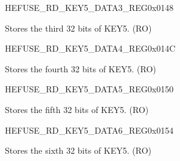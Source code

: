 \begin{register}{H}{EFUSE\_RD\_KEY5\_DATA3\_REG}{0x0148}\label{regdesc:EFUSERDKEY5DATA3REG}
%
\regnewline%
\begin{regdesc}\begin{reglist}
\label{fielddesc:EFUSEKEY5DATA3}\item [EFUSE\_KEY5\_DATA3] Stores the third 32 bits of KEY5. (RO)
\end{reglist}\end{regdesc}
\end{register}


\begin{register}{H}{EFUSE\_RD\_KEY5\_DATA4\_REG}{0x014C}\label{regdesc:EFUSERDKEY5DATA4REG}
%
\regnewline%
\begin{regdesc}\begin{reglist}
\label{fielddesc:EFUSEKEY5DATA4}\item [EFUSE\_KEY5\_DATA4] Stores the fourth 32 bits of KEY5. (RO)
\end{reglist}\end{regdesc}
\end{register}


\begin{register}{H}{EFUSE\_RD\_KEY5\_DATA5\_REG}{0x0150}\label{regdesc:EFUSERDKEY5DATA5REG}
%
\regnewline%
\begin{regdesc}\begin{reglist}
\label{fielddesc:EFUSEKEY5DATA5}\item [EFUSE\_KEY5\_DATA5] Stores the fifth 32 bits of KEY5. (RO)
\end{reglist}\end{regdesc}
\end{register}


\begin{register}{H}{EFUSE\_RD\_KEY5\_DATA6\_REG}{0x0154}\label{regdesc:EFUSERDKEY5DATA6REG}
%
\regnewline%
\begin{regdesc}\begin{reglist}
\label{fielddesc:EFUSEKEY5DATA6}\item [EFUSE\_KEY5\_DATA6] Stores the sixth 32 bits of KEY5. (RO)
\end{reglist}\end{regdesc}
\end{register}


